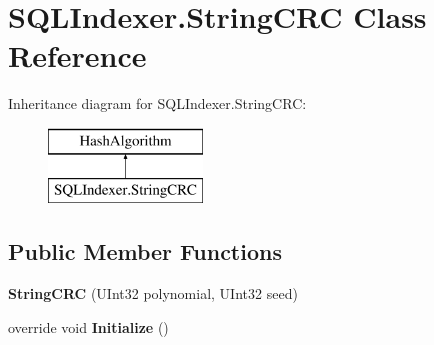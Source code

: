 \hypertarget{class_s_q_l_indexer_1_1_string_c_r_c}{\section{S\-Q\-L\-Indexer.\-String\-C\-R\-C Class Reference}
\label{class_s_q_l_indexer_1_1_string_c_r_c}
}
Inheritance diagram for S\-Q\-L\-Indexer.\-String\-C\-R\-C\-:\begin{figure}[H]
\begin{center}
\leavevmode
\includegraphics[height=2.000000cm]{class_s_q_l_indexer_1_1_string_c_r_c}
\end{center}
\end{figure}
\subsection*{Public Member Functions}
\begin{DoxyCompactItemize}
\item 
\hypertarget{class_s_q_l_indexer_1_1_string_c_r_c_a6bc007e166eae601a1743bbe0cf5a990}{{\bfseries String\-C\-R\-C} (U\-Int32 polynomial, U\-Int32 seed)}\label{class_s_q_l_indexer_1_1_string_c_r_c_a6bc007e166eae601a1743bbe0cf5a990}

\item 
\hypertarget{class_s_q_l_indexer_1_1_string_c_r_c_ad176054a3303d338efa34753d0e66f20}{override void {\bfseries Initialize} ()}\label{class_s_q_l_indexer_1_1_string_c_r_c_ad176054a3303d338efa34753d0e66f20}

\end{DoxyCompactItemize}
